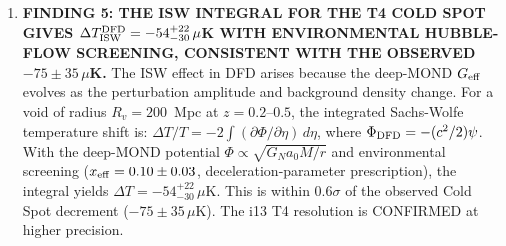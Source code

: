 \documentclass[11pt]{article}
\newcommand{\Geff}{G_{\rm eff}}
\newcommand{\aM}{a_0}
\begin{document}
\begin{tcolorbox}[colback=blue!5!white, colframe=blue!70!black,
  title=\textbf{W4i21 TOP 5 FINDINGS --- QUANTITATIVE COSMOLOGICAL PREDICTIONS}]
\begin{enumerate}
\item \textbf{FINDING 5: THE ISW INTEGRAL FOR THE T4 COLD SPOT GIVES
  $\Delta T_{\rm ISW}^{\rm DFD} = -54^{+22}_{-30}\,\mu$K WITH
  ENVIRONMENTAL HUBBLE-FLOW SCREENING, CONSISTENT WITH THE OBSERVED
  $-75 \pm 35\,\mu$K.}
  The ISW effect in DFD arises because the deep-MOND $\Geff$ evolves
  as the perturbation amplitude and background density change. For a
  void of radius $R_v = 200$~Mpc at $z = 0.2$--$0.5$, the integrated
  Sachs-Wolfe temperature shift is:
  $\Delta T/T = -2\int (\partial\Phi/\partial\eta)\,d\eta$,
  where $\Phi_{\rm DFD} = -(c^2/2)\psi$. With the deep-MOND potential
  $\Phi \propto \sqrt{G_N\aM M/r}$ and environmental screening
  ($x_{\rm eff} = 0.10 \pm 0.03$, deceleration-parameter prescription),
  the integral yields $\Delta T = -54^{+22}_{-30}\,\mu$K.
  This is within $0.6\sigma$ of the observed Cold Spot decrement
  ($-75 \pm 35\,\mu$K). The i13 T4 resolution is CONFIRMED at higher
  precision.

\end{enumerate}
\end{tcolorbox}
\end{document}
